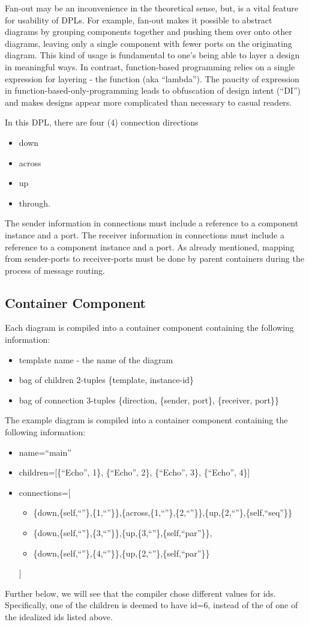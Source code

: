 \documentclass[10pt,anonymous,review]{acmart}
\begin{document}
Fan-out may be an inconvenience in the theoretical sense, but, is a vital feature for usability of DPLs. For example, fan-out makes it possible to abstract diagrams by grouping components together and pushing them over onto other diagrams, leaving only a single component with fewer ports on the originating diagram. This kind of usage is fundamental to one’s being able to layer a design in meaningful ways. In contrast, function-based programming relies on a single expression for layering - the function (aka “lambda”). The paucity of expression in function-based-only-programming leads to obfuscation of design intent (“DI”) and makes designs appear more complicated than necessary to casual readers.



In this DPL, there are four (4) connection directions
\begin{itemize}
\item down
\item across
\item up
\item through.
\end{itemize}
The sender information in connections must include a reference to a component instance and a port.
The receiver information in connections must include a reference to a component instance and a port.
As already mentioned, mapping from sender-ports to receiver-ports must be done by parent containers during the process of message routing.
\subsection{Container Component}
Each diagram is compiled into a container component containing the following information:
\begin{itemize}
\item template name - the name of the diagram
\item bag of children 2-tuples \{template, instance-id\}
\item bag of connection 3-tuples \{direction, \{sender, port\}, \{receiver, port\}\}
\end{itemize}
The example diagram is compiled into a container component containing the following information:
\begin{itemize}
\item name=“main”
\item children=[\{“Echo”, 1\}, \{“Echo”, 2\}, \{“Echo”, 3\}, \{“Echo”, 4\}]
\item connections=[
\begin{itemize}
  \item[] \{down,\{self,``''\},\{1,``”\}\},\{across,\{1,``”\},\{2,``”\}\},\{up,\{2,``”\},\{self,``seq''\}\}
  \item[] \{down,\{self,``”\},\{3,``”\}\},\{up,\{3,``”\},\{self,``par”\}\},
  \item[] \{down,\{self,``”\},\{4,``”\}\},\{up,\{2,``”\},\{self,``par”\}\}
\end{itemize}
]
\end{itemize}
Further below, we will see that the compiler chose different values for ids.
Specifically, one of the children is deemed to have id=6, instead of the of one of the idealized ids listed above.
\end{document}
